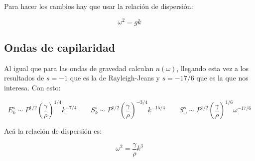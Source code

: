 Para hacer los cambios hay que usar la relación de dispersión:

\begin{equation}
	\omega^2=gk
\end{equation}

\subsection*{Ondas de capilaridad \cite{zakharovWeakTurbulenceCapillary1971}}
Al igual que para las ondas de gravedad calculan $n(\omega)$, llegando esta vez a los resultados de $s=-1$ que es la de Rayleigh-Jeans y $s=-17/6$ que es la que nos interesa. Con esto:

\begin{equation}
	E_k^s \sim P^{1/2} \left(\frac{\gamma}{\rho}\right)^{1/4} k^{-7/4} \qquad S_k^s \sim P^{1/2} \left(\frac{\gamma}{\rho}\right)^{-3/4} k^{-15/4} \qquad S_\omega^s  \sim P^{1/2} \left(\frac{\gamma}{\rho}\right)^{1/6} \omega^{-17/6}
\end{equation}   

Acá la relación de dispersión es:

\begin{equation}
	\omega^2 = \frac{\gamma}{\rho}k^3
\end{equation}



%
%
%
%

